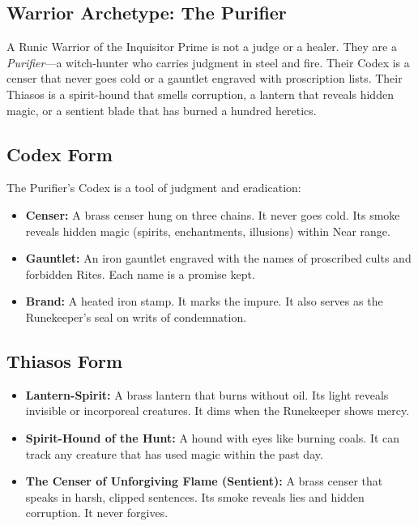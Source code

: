 \subsection{Warrior Archetype: The Purifier}

A Runic Warrior of the Inquisitor Prime is not a judge or a healer. They are a \textit{Purifier}—a witch-hunter who carries judgment in steel and fire. Their Codex is a censer that never goes cold or a gauntlet engraved with proscription lists. Their Thiasos is a spirit-hound that smells corruption, a lantern that reveals hidden magic, or a sentient blade that has burned a hundred heretics.

\subsection{Codex Form}

The Purifier's Codex is a tool of judgment and eradication:

\begin{itemize}
\item \textbf{Censer:} A brass censer hung on three chains. It never goes cold. Its smoke reveals hidden magic (spirits, enchantments, illusions) within Near range.
\item \textbf{Gauntlet:} An iron gauntlet engraved with the names of proscribed cults and forbidden Rites. Each name is a promise kept.
\item \textbf{Brand:} A heated iron stamp. It marks the impure. It also serves as the Runekeeper's seal on writs of condemnation.
\end{itemize}

\subsection{Thiasos Form}

\begin{itemize}
\item \textbf{Lantern-Spirit:} A brass lantern that burns without oil. Its light reveals invisible or incorporeal creatures. It dims when the Runekeeper shows mercy.
\item \textbf{Spirit-Hound of the Hunt:} A hound with eyes like burning coals. It can track any creature that has used magic within the past day.
\item \textbf{The Censer of Unforgiving Flame (Sentient):} A brass censer that speaks in harsh, clipped sentences. Its smoke reveals lies and hidden corruption. It never forgives.
\end{itemize}


